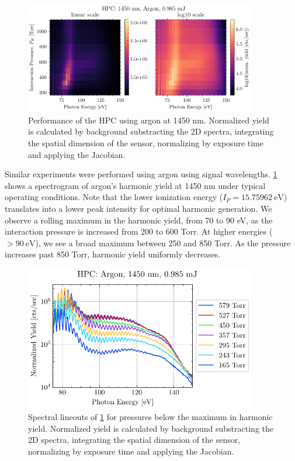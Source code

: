 \begin{figure}
	\centering
	\includegraphics[width=0.9\textwidth]{figures/chap3/HPC_1450nm_Ar_spectrogram.pdf}
	\caption{Performance of the HPC using argon at 1450 nm. Normalized yield is calculated by background substracting the 2D spectra, integrating the spatial dimension of the sensor, normalizing by exposure time and applying the Jacobian.}
	\label{fig:HPC_1450nm_Ar_spectrogram}
\end{figure}

Similar experiments were performed using argon using signal wavelengths. \cref{fig:HPC_1450nm_Ar_spectrogram} shows a spectrogram of argon's harmonic yield at 1450 nm under typical operating conditions. Note that the lower ionization energy ($I_P = 15.75962 \ \textrm{eV}$) translates into a lower peak intensity for optimal harmonic generation. We observe a rolling maximum in the harmonic yield, from 70 to 90 eV, as the interaction pressure is increased from 200 to 600 Torr. At higher energies ($> 90 \ \textrm{eV}$), we see a broad maximum between 250 and 850 Torr. As the pressure increases past 850 Torr, harmonic yield uniformly decreases.

\begin{figure}
	\centering
	\includegraphics[width=0.9\textwidth]{figures/chap3/HPC_1450nm_Ar_lineouts.pdf}
	\caption{Spectral lineouts of \cref{fig:HPC_1450nm_Ar_spectrogram} for pressures below the maximum in harmonic yield. Normalized yield is calculated by background substracting the 2D spectra, integrating the spatial dimension of the sensor, normalizing by exposure time and applying the Jacobian.}
	\label{fig:HPC_1450nm_Ar_lineouts}
\end{figure}

